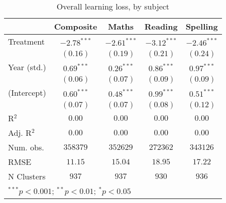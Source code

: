 
\begin{table}
\begin{center}
\begin{tabular}{l c c c c}
\hline
 & Composite & Maths & Reading & Spelling \\
\hline
Treatment   & $-2.78^{***}$ & $-2.61^{***}$ & $-3.12^{***}$ & $-2.46^{***}$ \\
            & $(0.16)$      & $(0.19)$      & $(0.21)$      & $(0.24)$      \\
Year (std.) & $0.69^{***}$  & $0.26^{***}$  & $0.86^{***}$  & $0.97^{***}$  \\
            & $(0.06)$      & $(0.07)$      & $(0.09)$      & $(0.09)$      \\
(Intercept) & $0.60^{***}$  & $0.48^{***}$  & $0.99^{***}$  & $0.51^{***}$  \\
            & $(0.07)$      & $(0.07)$      & $(0.08)$      & $(0.12)$      \\
\hline
R$^2$       & $0.00$        & $0.00$        & $0.00$        & $0.00$        \\
Adj. R$^2$  & $0.00$        & $0.00$        & $0.00$        & $0.00$        \\
Num. obs.   & $358379$      & $352629$      & $272362$      & $343126$      \\
RMSE        & $11.15$       & $15.04$       & $18.95$       & $17.22$       \\
N Clusters  & $937$         & $937$         & $930$         & $936$         \\
\hline
\multicolumn{5}{l}{\scriptsize{$^{***}p<0.001$; $^{**}p<0.01$; $^{*}p<0.05$}}
\end{tabular}
\caption{Overall learning loss, by subject}
\label{table:overall}
\end{center}
\end{table}
